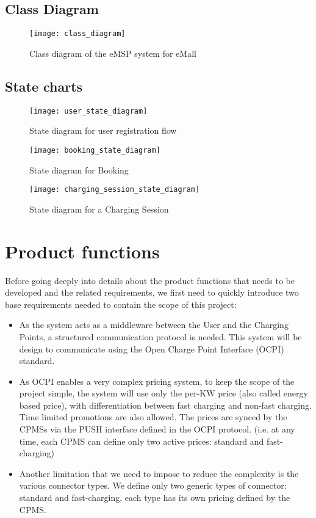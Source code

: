 \newpage

\subsection{Class Diagram}

\begin{figure}[h]
\centering
\texttt{[image: class\_diagram]}
\caption{Class diagram of the eMSP system for eMall}
\end{figure}

\clearpage
\newpage

\subsection{State charts}

\begin{figure}[h]
\centering
\texttt{[image: user\_state\_diagram]}
\caption{State diagram for user registration flow}
\end{figure}

\begin{figure}[h]
\centering
\texttt{[image: booking\_state\_diagram]}
\caption{State diagram for Booking}
\end{figure}

\begin{figure}[h]
\centering
\texttt{[image: charging\_session\_state\_diagram]}
\caption{State diagram for a Charging Session}
\end{figure}

\clearpage
\newpage


\section{Product functions}
Before going deeply into details about the product functions that needs to be developed and the related requirements, we first need to quickly introduce two base requirements needed to contain the scope of this project:\\

\begin{itemize}
	\item As the system acts as a middleware between the User and the Charging Points, a structured communication protocol is needed. This system will be design to communicate using the Open Charge Point Interface (OCPI) standard.
	\item As OCPI enables a very complex pricing system, to keep the scope of the project simple, the system will use only the per-KW price (also called energy based price), with differentiation between fast charging and non-fast charging. Time limited promotions are also allowed. The prices are synced by the CPMSs via the PUSH interface defined in the OCPI protocol. (i.e. at any time, each CPMS can define only two active prices: standard and fast-charging)
	\item Another limitation that we need to impose to reduce the complexity is the various connector types. We define only two generic types of connector: standard and fast-charging, each type has its own pricing defined by the CPMS.
\end{itemize}

